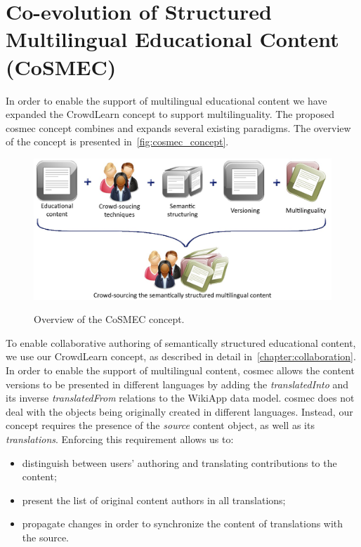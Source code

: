 \documentclass[PhD, Submit, ngerman,UKenglish,table]{scrbook}
\begin{document}
\section{Co-evolution of Structured Multilingual Educational Content (CoSMEC)}
\label{sec:multilinguality}
In order to enable the support of multilingual educational content we have expanded the CrowdLearn concept to support multilinguality.
The proposed \gls{cosmec} concept combines and expands several existing paradigms.
The overview of the concept is presented in~\autoref{fig:cosmec_concept}.

\begin{figure}[!h]
\centering
\includegraphics[width=.8\textwidth]{images/CoSMEC_concept.jpg}\\
\caption{Overview of the CoSMEC concept.}
\label{fig:cosmec_concept}
\end{figure}

To enable collaborative authoring of semantically structured educational content, we use our CrowdLearn concept, as described in detail in~\autoref{chapter:collaboration}.
In order to enable the support of multilingual content, \gls{cosmec} allows the content versions to be presented in different languages by adding the \emph{translatedInto} and its inverse \emph{translatedFrom} relations to the WikiApp data model.
\gls{cosmec} does not deal with the objects being originally created in different languages.
Instead, our concept requires the presence of the \emph{source} content object, as well as its \emph{translations}.
Enforcing this requirement allows us to:
\begin{itemize}
\item distinguish between users' authoring and translating contributions to the content;
\item present the list of original content authors in all translations;
\item propagate changes in order to synchronize the content of translations with the source.
\end{itemize}  
\end{document}
